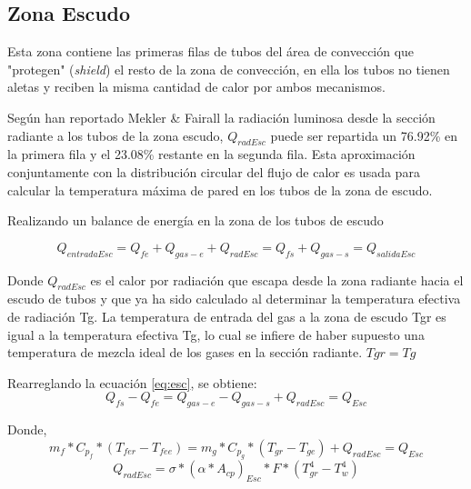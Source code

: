 \subsection{Zona Escudo}
\par Esta zona contiene las primeras filas de tubos del área de convección que "protegen" (\textit{shield}) el resto de la zona de convección, en ella los tubos no tienen aletas y reciben la misma cantidad de calor por ambos mecanismos.

\par Según  han reportado  Mekler \& Fairall\cite{bib:mekler}  la radiación luminosa desde la sección radiante a los tubos de la zona escudo, $Q_{radEsc}$ puede ser repartida un 76.92\% en la primera fila y el 23.08\% restante en la segunda fila. Esta aproximación conjuntamente con la distribución circular del flujo de calor es usada para calcular la temperatura máxima de pared en los tubos de la zona de escudo.

\par Realizando un balance de energía en la zona de los tubos de escudo

\begin{equation}
\label{eq:esc}
Q_{entradaEsc} = Q_{fe} + Q_{gas-e} + Q_{radEsc} = 
Q_{fs} + Q_{gas-s} = Q_{salidaEsc}
\end{equation}

\par Donde $Q_{radEsc}$ es el calor por radiación que escapa desde la zona radiante hacia el escudo de tubos y que ya ha sido calculado al determinar la temperatura efectiva de radiación Tg. La temperatura de entrada del gas a la zona de escudo Tgr es igual a la temperatura efectiva Tg, lo cual se infiere de haber supuesto una temperatura de mezcla ideal de los gases en la sección radiante. $Tgr = Tg$

\par Rearreglando la ecuación \ref{eq:esc}, se obtiene:
\begin{equation*}
Q_{fs} - Q_{fe} = Q_{gas-e} - Q_{gas-s} + Q_{radEsc} = Q_{Esc}
\end{equation*}
\par Donde,
\begin{equation}
\label{eq:qesc}
m_{f} *C_{p_f} *(T_{fer} - T_{fee}) = 
m_{g} *C_{p_g} *(T_{gr}  - T_{ge}) + Q_{radEsc} = Q_{Esc}
\end{equation}
\begin{equation}
Q_{radEsc} = \sigma *(\alpha *A_{cp} )_{Esc} *F *(T_{gr}^4 -T_w^4)
\end{equation}

